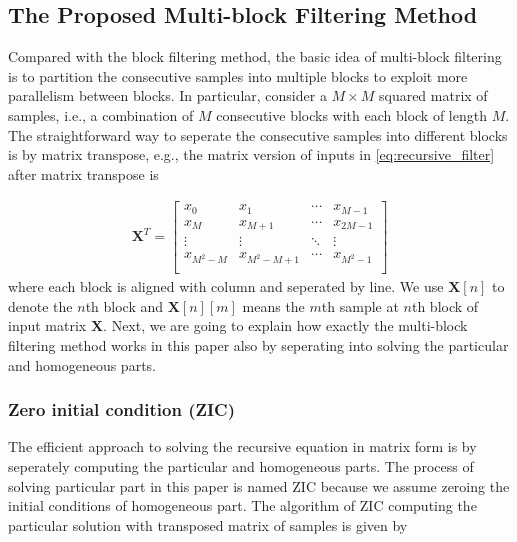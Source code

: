 \subsection{The Proposed Multi-block Filtering Method}

Compared with the block filtering method, the basic idea of multi-block filtering is to partition the consecutive samples into multiple blocks to exploit more
parallelism between blocks. 
In particular, consider a $M \times M$ squared matrix of samples, i.e., a combination of $M$ consecutive blocks with each block of length $M$.
The straightforward way to seperate the consecutive samples into different blocks is by matrix transpose, 
e.g., the matrix version of inputs in \eqref{eq:recursive_filter} after matrix transpose is 

\begin{equation*}
    \begin{aligned}
    \bm{X}^T {=} \left[
        \begin{array}{c|c|c|c}
        x_0 & x_1 & \cdots & x_{M-1} \\ 
        x_M & x_{M+1} & \cdots & x_{2M-1} \\
        \vdots & \vdots & \ddots & \vdots \\
        x_{M^2-M} & x_{M^2-M+1} &\cdots & x_{M^2-1} \\
        \end{array}\right]
    \end{aligned}
\end{equation*}
where each block is aligned with column and seperated by line.
We use $\bm{X}[n]$ to denote the $n$th block and $\bm{X}[n][m]$ means the $m$th sample at $n$th block
of input matrix $\bm{X}$. Next, we are going to explain how exactly the multi-block filtering method works in this paper 
also by seperating into solving the particular and homogeneous parts.

\subsubsection{Zero initial condition (ZIC)}

The efficient approach to solving the recursive equation in matrix form is by seperately computing the
particular and homogeneous parts. 
The process of solving particular part in this paper is named 
ZIC because we assume zeroing the initial conditions of homogeneous part. 
The algorithm of ZIC computing the particular solution with transposed matrix of samples is given by

